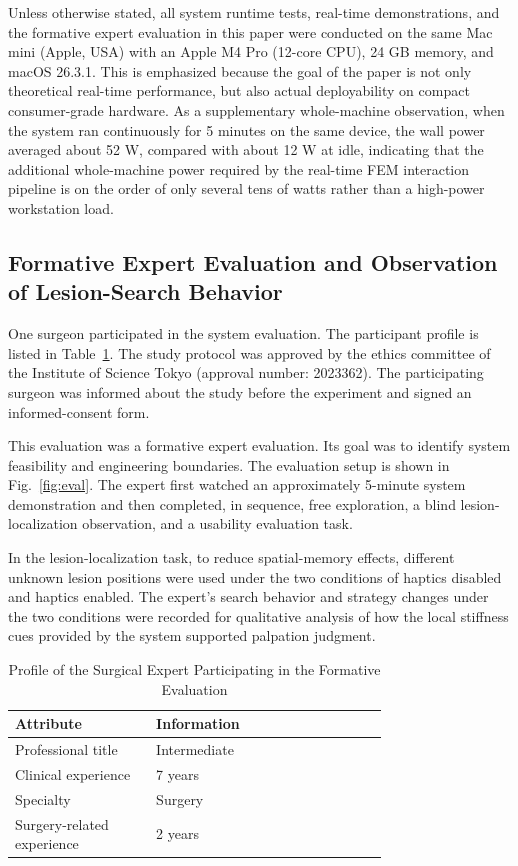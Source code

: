 \documentclass{ieeeaccess}
\begin{document}
Unless otherwise stated, all system runtime tests, real-time demonstrations, and the formative expert evaluation in this paper were conducted on the same Mac mini (Apple, USA) with an Apple M4 Pro (12-core CPU), 24 GB memory, and macOS 26.3.1. This is emphasized because the goal of the paper is not only theoretical real-time performance, but also actual deployability on compact consumer-grade hardware. As a supplementary whole-machine observation, when the system ran continuously for 5 minutes on the same device, the wall power averaged about 52 W, compared with about 12 W at idle, indicating that the additional whole-machine power required by the real-time FEM interaction pipeline is on the order of only several tens of watts rather than a high-power workstation load.

\subsection{Formative Expert Evaluation and Observation of Lesion-Search Behavior}
One surgeon participated in the system evaluation. The participant profile is listed in Table~\ref{tab:expert}. The study protocol was approved by the ethics committee of the Institute of Science Tokyo (approval number: 2023362). The participating surgeon was informed about the study before the experiment and signed an informed-consent form.

This evaluation was a formative expert evaluation. Its goal was to identify system feasibility and engineering boundaries. The evaluation setup is shown in Fig.~\ref{fig:eval}. The expert first watched an approximately 5-minute system demonstration and then completed, in sequence, free exploration, a blind lesion-localization observation, and a usability evaluation task.

In the lesion-localization task, to reduce spatial-memory effects, different unknown lesion positions were used under the two conditions of haptics disabled and haptics enabled. The expert's search behavior and strategy changes under the two conditions were recorded for qualitative analysis of how the local stiffness cues provided by the system supported palpation judgment.

\begin{table}[htbp]
\caption{Profile of the Surgical Expert Participating in the Formative Evaluation}
\label{tab:expert}
\centering
\footnotesize
\renewcommand{\arraystretch}{1.15}
\begin{tabular}{|p{0.28\linewidth}|p{0.46\linewidth}|}
\hline
Attribute & Information \\
\hline
Professional title & Intermediate \\
\hline
Clinical experience & 7 years \\
\hline
Specialty & Surgery \\
\hline
Surgery-related experience & 2 years \\
\hline
\end{tabular}
\end{table}
\end{document}
